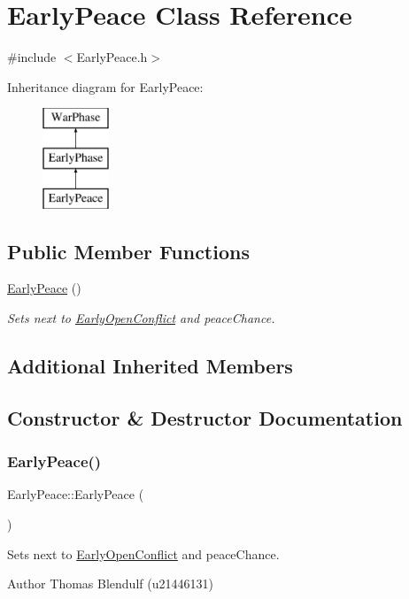 \hypertarget{class_early_peace}{}\section{Early\+Peace Class Reference}
\label{class_early_peace}


{\ttfamily \#include $<$Early\+Peace.\+h$>$}

Inheritance diagram for Early\+Peace\+:\begin{figure}[H]
\begin{center}
\leavevmode
\includegraphics[height=3.000000cm]{class_early_peace}
\end{center}
\end{figure}
\subsection*{Public Member Functions}
\begin{DoxyCompactItemize}
\item 
\mbox{\hyperlink{class_early_peace_a315168fb69ec7a28d0c5f47958ff5924}{Early\+Peace}} ()
\begin{DoxyCompactList}\small\item\em Sets next to \mbox{\hyperlink{class_early_open_conflict}{Early\+Open\+Conflict}} and peace\+Chance. \end{DoxyCompactList}\end{DoxyCompactItemize}
\subsection*{Additional Inherited Members}


\subsection{Constructor \& Destructor Documentation}
\mbox{\label{class_early_peace_a315168fb69ec7a28d0c5f47958ff5924}} 
\subsubsection{\texorpdfstring{EarlyPeace()}{EarlyPeace()}}
{\footnotesize\ttfamily Early\+Peace\+::\+Early\+Peace (\begin{DoxyParamCaption}{ }\end{DoxyParamCaption})}



Sets next to \mbox{\hyperlink{class_early_open_conflict}{Early\+Open\+Conflict}} and peace\+Chance. 

\begin{DoxyAuthor}{Author}
Thomas Blendulf (u21446131) 
\end{DoxyAuthor}
